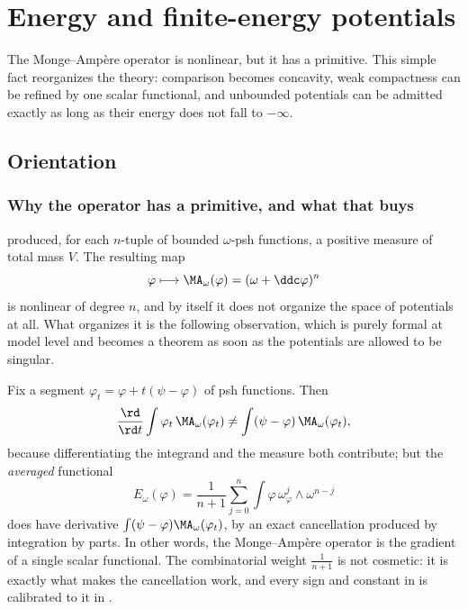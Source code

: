 \chapter{Energy and finite-energy potentials}
\label{chap:bfj-energy}

The Monge--Amp\`ere operator is nonlinear, but it has a primitive.  This
simple fact reorganizes the theory: comparison becomes concavity, weak
compactness can be refined by one scalar functional, and unbounded potentials
can be admitted exactly as long as their energy does not fall to
\(-\infty\).

\section{Orientation}
\label{sec:ch26-orientation}

\subsection{Why the operator has a primitive, and what that buys}
\label{sec:ch26-why}

 produced, for each \(n\)-tuple of bounded
\(\omega\)-psh functions, a positive measure of total mass \(V\).  The
resulting map
\[
 \varphi\longmapsto\MA_\omega(\varphi)
 =(\omega+\ddc\varphi)^n
\]
is nonlinear of degree \(n\), and by itself it does not organize the space of
potentials at all.  What organizes it is the following observation, which is
purely formal at model level and becomes a theorem as soon as the potentials
are allowed to be singular.

Fix a segment \(\varphi_t=\varphi+t(\psi-\varphi)\) of psh functions.  Then
\begin{equation}
\label{eq:ch26-motivating-variation}
 \frac{\rd}{\rd t}\int\varphi_t\,\MA_\omega(\varphi_t)
 \neq\int(\psi-\varphi)\,\MA_\omega(\varphi_t),
\end{equation}
because differentiating the integrand and the measure both contribute; but
the \emph{averaged} functional
\[
 E_\omega(\varphi)
 =\frac1{n+1}\sum_{j=0}^n\int\varphi\,
   \omega_\varphi^j\wedge\omega^{n-j}
\]
does have derivative \(\int(\psi-\varphi)\MA_\omega(\varphi_t)\), by an exact
cancellation produced by integration by parts.  In other words, the
Monge--Amp\`ere operator is the gradient of a single scalar functional.  The
combinatorial weight \(\tfrac1{n+1}\) is not cosmetic: it is exactly what
makes the cancellation work, and every sign and constant in
 is calibrated to it in .

